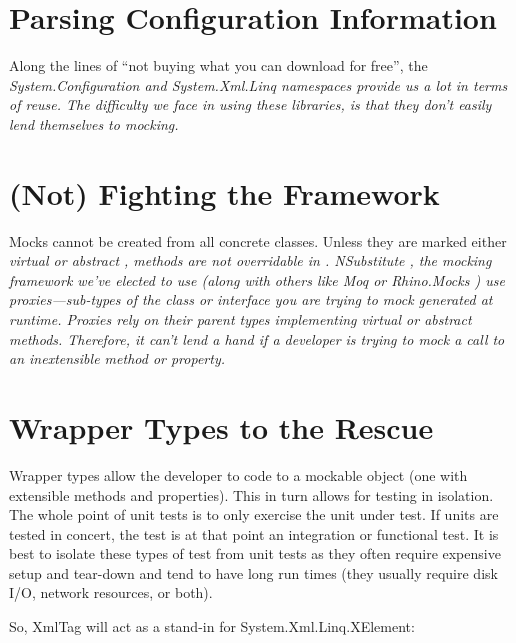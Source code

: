 \section{Parsing Configuration Information}
Along the lines of ``not buying what you can download for free'', the \em System.Configuration \em and \em System.Xml.Linq \em namespaces provide us a lot in terms of reuse. The difficulty we face in using these libraries, is that they don't easily lend themselves to mocking.

\section{(Not) Fighting the Framework}
Mocks cannot be created from all concrete classes. Unless they are marked either \em virtual \em or \em abstract \em, methods are not overridable in \CSharp. \em NSubstitute \em, the mocking framework we've elected to use (along with others like \em Moq \em or \em Rhino.Mocks \em) use proxies---sub-types of the class or interface you are trying to mock generated at runtime. Proxies rely on their parent types implementing virtual or abstract methods. Therefore, it can't lend a hand if a developer is trying to mock a call to an inextensible method or property.

\section{Wrapper Types to the Rescue}
Wrapper types allow the developer to code to a mockable object (one with extensible methods and properties). This in turn allows for testing in isolation. The whole point of unit tests is to only exercise the unit under test. If units are tested in concert, the test is at that point an integration or functional test. It is best to isolate these types of test from unit tests as they often require expensive setup and tear-down and tend to have long run times (they usually require disk I/O, network resources, or both).

So, XmlTag will act as a stand-in for System.Xml.Linq.XElement:

